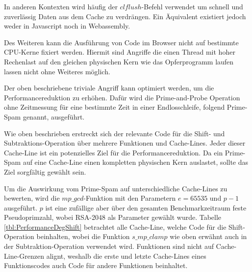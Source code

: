In anderen Kontexten wird häufig der $clflush$-Befehl verwendet um schnell und zuverlässig Daten aus dem Cache zu verdrängen. 
Ein Äquivalent existiert jedoch weder in Javascript noch in Webassembly.

Des Weiteren kann die Ausführung von Code im Browser nicht auf bestimmte CPU-Kerne fixiert werden. Hiermit sind Angriffe die einen Thread mit hoher Rechenlast auf den gleichen physischen Kern wie das Opferprogramm laufen lassen nicht ohne Weiteres möglich.

Der oben beschriebene triviale Angriff kann optimiert werden, um die Performancereduktion zu erhöhen. Dafür wird die Prime-and-Probe Operation ohne Zeitmessung für eine bestimmte Zeit in einer Endlosschleife, folgend Prime-Spam genannt, ausgeführt. 

Wie oben beschrieben erstreckt sich der relevante Code für die Shift- und Subtraktions-Operation über mehrere Funktionen und Cache-Lines.
Jeder dieser Cache-Line ist ein potenzielles Ziel für die Performancereduktion.
Da ein Prime-Spam auf eine Cache-Line einen kompletten physischen Kern auslastet, sollte das Ziel sorgfältig gewählt sein.

Um die Auswirkung vom Prime-Spam auf unterschiedliche Cache-Lines zu bewerten, wird die $mp\_gcd$-Funktion mit den Parametern $e=65535$ und $p-1$ ausgeführt.
$p$ ist eine zufällige aber über den gesamten Benchmarkzeitraum feste Pseudoprimzahl, wobei RSA-2048 als Parameter gewählt wurde.
Tabelle \ref{tbl:PerformanceDegShift} betrachtet alle Cache-Line, welche Code für die Shift-Operation beinhalten, wobei die Funktion $s\_mp\_clamp$ wie oben erwähnt auch in der Subtraktion-Operation verwendet wird.
Funktionen sind nicht auf Cache-Line-Grenzen alignt, weshalb die erste und letzte Cache-Lines eines Funktionscodes auch Code für andere Funktionen beinhaltet.

